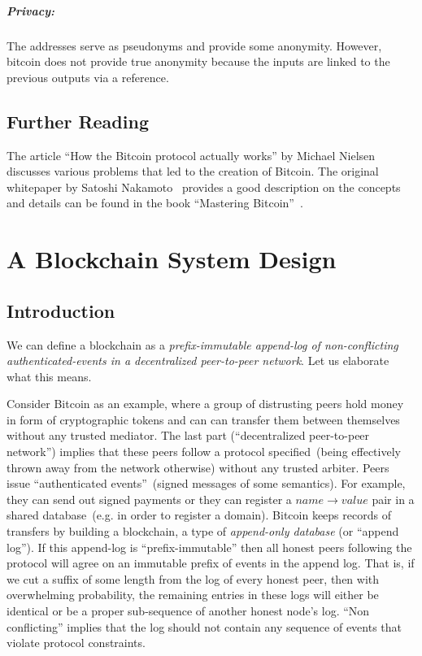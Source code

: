 \documentclass[]{report}   %
\begin{document}
\paragraph{Privacy:} The addresses serve as pseudonyms and provide some anonymity. However, bitcoin does not provide true anonymity because the inputs are linked to the previous outputs via a reference.

\section{Further Reading}

The article ``How the Bitcoin protocol actually works'' by Michael Nielsen~\cite{nielsen} discusses various problems that led to the creation of Bitcoin. The original whitepaper by Satoshi Nakamoto~\cite{Nakamoto2008} provides a good description on the concepts and details can be found in the book ``Mastering Bitcoin''~\cite{antonopoulos2014mastering}. 



\chapter{A Blockchain System Design}             %
\label{blockchain-intro}
\section{Introduction}     

We can define a blockchain as a {\em prefix-immutable append-log of non-conflicting authenticated-events in a decentralized peer-to-peer network}. Let us elaborate what this means.

Consider Bitcoin as an example, where a group of distrusting peers hold money in form of cryptographic tokens and can can transfer them between themselves without any trusted mediator. The last part (``decentralized peer-to-peer network'') implies that these peers follow a protocol specified~(being effectively thrown away from the network otherwise) without any trusted arbiter. Peers issue ``authenticated events''~(signed messages of some semantics). For example, they can send out signed payments or they can register a \(name \rightarrow value\) pair in a shared database~(e.g. in order to register a domain). Bitcoin keeps records of transfers by building a blockchain, a type of {\em append-only database} (or ``append log''). If this append-log is ``prefix-immutable'' then all honest peers following the protocol will agree on an immutable prefix of events in the append log. That is, if we cut a suffix of some length from the log of every honest peer, then with overwhelming probability, the remaining entries in these logs will either be identical or be a proper sub-sequence of another honest node's log. ``Non conflicting'' implies that the log should not contain any sequence of events that violate protocol constraints.
\end{document}
